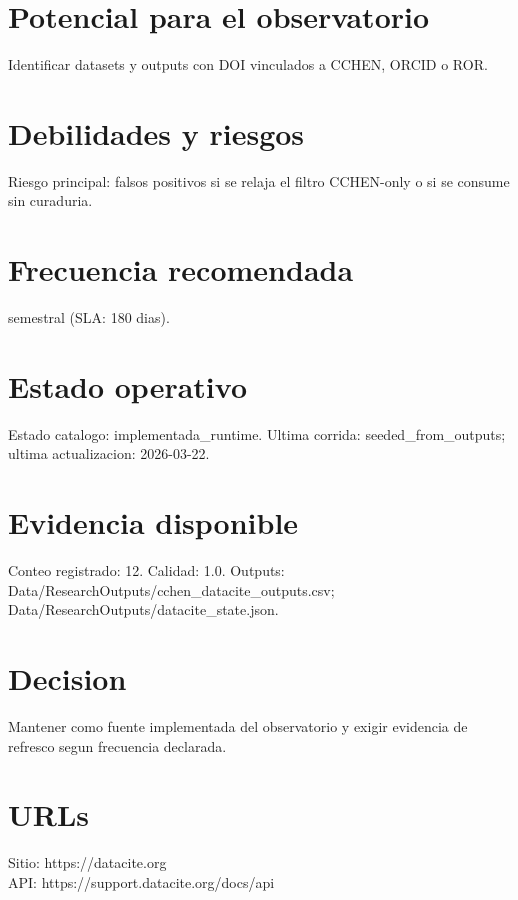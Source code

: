 \documentclass[10pt,a4paper]{article}
\begin{document}
\section*{Potencial para el observatorio}
Identificar datasets y outputs con DOI vinculados a CCHEN, ORCID o ROR.

\section*{Debilidades y riesgos}
Riesgo principal: falsos positivos si se relaja el filtro CCHEN-only o si se consume sin curaduria.

\section*{Frecuencia recomendada}
semestral (SLA: 180 dias).

\section*{Estado operativo}
Estado catalogo: implementada\_runtime. Ultima corrida: seeded\_from\_outputs; ultima actualizacion: 2026-03-22.

\section*{Evidencia disponible}
Conteo registrado: 12. Calidad: 1.0. Outputs: Data/ResearchOutputs/cchen\_datacite\_outputs.csv; Data/ResearchOutputs/datacite\_state.json.

\section*{Decision}
Mantener como fuente implementada del observatorio y exigir evidencia de refresco segun frecuencia declarada.


\section*{URLs}
Sitio: https://datacite.org\\
API: https://support.datacite.org/docs/api
\end{document}
